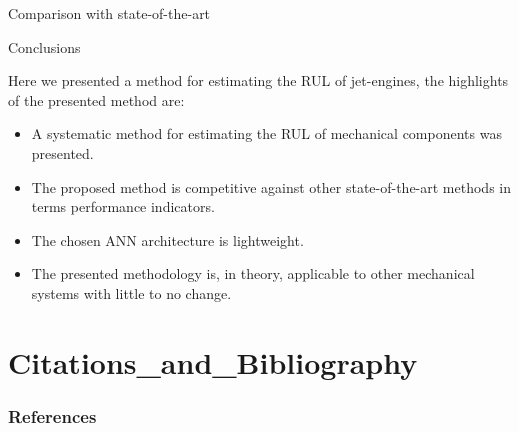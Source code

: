 \documentclass{beamer}
\begin{document}
\begin{darkframes}
\begin{frame}{Comparison with state-of-the-art}
     \end{frame}
     
\begin{frame}{Conclusions}
     
	Here we presented a method for estimating the RUL of jet-engines, the highlights of the presented method are:     
     
	\begin{itemize}
	\item A systematic method for estimating the RUL of mechanical components was presented.
	\item The proposed method is competitive against other state-of-the-art methods in terms performance indicators.
	\item The chosen ANN architecture is lightweight.
	\item The presented methodology is, in theory, applicable to other mechanical systems with little to no change.
	\end{itemize}
     
     \end{frame}
     
     \section{Citations_and_Bibliography}

\begin{frame}[allowframebreaks]
        \frametitle{References}
        
        
\end{frame}
    

  \end{darkframes}
\end{document}
